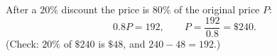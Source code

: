 After a $20\%$ discount the price is $80\%$ of the original price $P$:
\[0.8P=192,\qquad P=\dfrac{192}{0.8}=\boxed{\$240}.\]
(Check: $20\%$ of $\$240$ is $\$48$, and $240-48=192$.)
